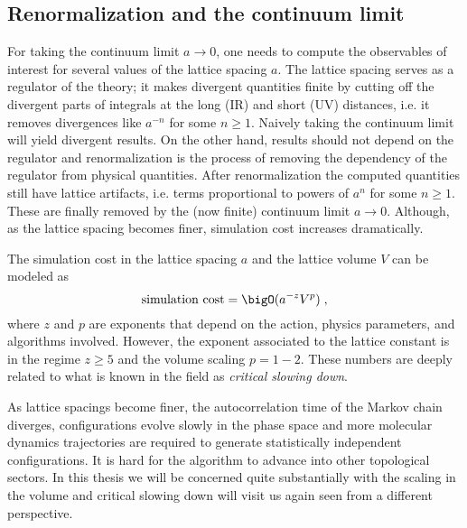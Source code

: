 

\subsection{Renormalization and the continuum limit}

For taking the continuum limit $a \to 0$, one needs to compute the observables of interest for several values of the lattice spacing $a$.
The lattice spacing serves as a regulator of the theory; it makes divergent quantities finite by cutting off the divergent parts of integrals at the long (IR) and short (UV) distances, i.e. it removes divergences like $a^{-n}$ for some $n \geq 1$.
Naively taking the continuum limit will yield divergent results.
On the other hand, results should not depend on the regulator and renormalization is the process of removing the dependency of the regulator from physical quantities.
After renormalization the computed quantities still have lattice artifacts, i.e. terms proportional to powers of $a^{n}$ for some $n \geq 1$.
These are finally removed by the (now finite) continuum limit $a \to 0$.
Although, as the lattice spacing becomes finer, simulation cost increases dramatically.

The simulation cost in the lattice spacing $a$ and the lattice volume $V$ can be modeled as~\cite{Luscher:1998pe}
\begin{equation}
\text{simulation cost} = \bigO( a^{-z} V^{p} )\;,
\end{equation}
where $z$ and $p$ are exponents that depend on the action, physics parameters, and algorithms involved.
However, the exponent associated to the lattice constant is in the regime $z \geq 5$ and the volume scaling $p = 1-2$.
These numbers are deeply related to what is known in the field as \emph{critical slowing down}.

As lattice spacings become finer, the autocorrelation time of the Markov chain diverges, configurations evolve slowly in the phase space and more molecular dynamics trajectories are required to generate statistically independent configurations.
It is hard for the algorithm to advance into other topological sectors.
In this thesis we will be concerned quite substantially with the scaling in the volume and critical slowing down will visit us again seen from a different perspective.

